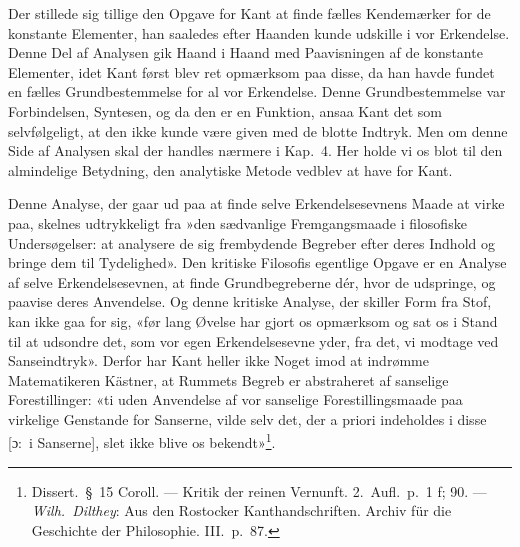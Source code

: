 \documentclass[12pt,a4paper]{article}
\newcommand{\apage}[1]{\marginnote{\footnotesize\textit{[#1]}}}
\begin{document}
Der stillede sig tillige den Opgave for Kant at finde fælles Kendemærker
for de konstante Elementer, han saaledes efter Haanden kunde udskille i
vor Erkendelse. Denne \apage{28}  Del af Analysen gik Haand i Haand med Paavisningen
af de konstante Elementer, idet Kant først blev ret opmærksom paa disse,
da han havde fundet en fælles Grundbestemmelse for al vor Erkendelse.
Denne Grundbestemmelse var Forbindelsen, Syntesen, og da den er en
Funktion, ansaa Kant det som selvfølgeligt, at den ikke kunde være given
med de blotte Indtryk. Men om denne Side af Analysen skal der handles
nærmere i Kap.\ 4. Her holde vi os blot til den almindelige Betydning,
den analytiske Metode vedblev at have for Kant.

Denne Analyse, der gaar ud paa at finde selve Erkendelsesevnens Maade at
virke paa, skelnes udtrykkeligt fra »den sædvanlige Fremgangsmaade i
filosofiske Undersøgelser: at analysere de sig frembydende Begreber efter
deres Indhold og bringe dem til Tydelighed». Den kritiske Filosofis
egentlige Opgave er en Analyse af selve Erkendelsesevnen, at finde
Grundbegreberne dér, hvor de udspringe, og paavise deres Anvendelse. Og
denne kritiske Analyse, der skiller Form fra Stof, kan ikke gaa for sig,
«før lang Øvelse har gjort os opmærksom og sat os i Stand til at udsondre
det, som vor egen Erkendelsesevne yder, fra det, vi modtage ved
Sanseindtryk». Derfor har Kant heller ikke Noget imod at indrømme
Matematikeren Kästner, at Rummets Begreb er abstraheret af sanselige
Forestillinger: «ti uden Anvendelse af vor sanselige Forestillingsmaade
paa virkelige Genstande for Sanserne, vilde selv det, der a priori
indeholdes i disse [ɔ:\ i Sanserne], slet ikke blive os
bekendt»\footnote{Dissert.\ §\ 15 Coroll. --- Kritik der reinen
Vernunft. 2.\ Aufl.\ p.\ 1 f; 90. --- \emph{Wilh.\ Dilthey}: Aus den
Rostocker Kanthandschriften. Archiv für die Geschichte der Philosophie.
III.\ p.\ 87.}.
\end{document}
